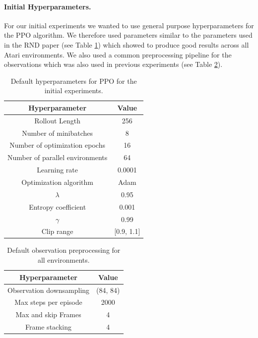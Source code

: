 \paragraph{Initial Hyperparameters.}
For our initial experiments we wanted to use general purpose hyperparameters for the PPO algorithm. We therefore used parameters similar to the parameters used in the RND paper \cite{burda2018exploration} (see Table \ref{tab:PPOHyperparemeters}) which showed to produce good results across all Atari environments. We also used a common preprocessing pipeline for the observations which was also used in previous experiments \cite{huang2019} (see Table \ref{tab:RNDPreprocessing}). 


\begin{table} [ht]
    \begin{center}
        \begin{tabular}{|c|c|}
            \hline
            Hyperparameter & Value \\
            \hline
            Rollout Length & 256 \\
            Number of minibatches & 8 \\
            Number of optimization epochs & 16 \\
            Number of parallel environments & 64 \\
            Learning rate & 0.0001 \\
            Optimization algorithm & Adam \cite{kingma2014adam} \\
            $\lambda$ & 0.95 \\
            Entropy coefficient & 0.001 \\
            $\gamma$ & 0.99 \\
            Clip range & [0.9, 1.1] \\
            \hline
        \end{tabular}
    \end{center}
    \caption[Default Hyperparameters]{Default hyperparameters for PPO for the initial experiments.} \label{tab:PPOHyperparemeters}
\end{table}

\begin{table} [ht]
    \begin{center}
        \begin{tabular}{|c|c|}
            \hline
            Hyperparameter & Value \\
            \hline
            Observation downsampling & (84, 84) \\
            Max steps per episode & 2000 \\
            Max and skip Frames & 4 \\
            Frame stacking & 4 \\
            \hline
        \end{tabular}
    \end{center}
    \caption[Default Observation Preprocessing]{Default observation preprocessing for all environments.} \label{tab:RNDPreprocessing}
\end{table}

